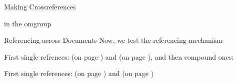 \begin{omgroup}[id=mcr]{Making Crossreferences}
\begin{omtext} 
 in the omgroup 
\end{omtext} 
\end{omgroup} 
\newpage
\begin{omgroup}[id=rad]{Referencing across Documents}
  Now, we test the referencing mechanism
  \begin{omtext}[title=Internal Referencing]
    First single refrences:  (on page ) and  (on page
    ), and then compound ones: 
\end{omtext}
 
\begin{omtext}[title=External Referencing]
  First single references:   (on page ) and
    (on page )
\end{omtext}
\end{omgroup} 

